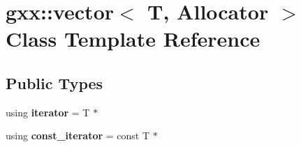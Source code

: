 \hypertarget{classgxx_1_1vector}{}\section{gxx\+:\+:vector$<$ T, Allocator $>$ Class Template Reference}
\label{classgxx_1_1vector}
\subsection*{Public Types}
\begin{DoxyCompactItemize}
\item 
using {\bfseries iterator} = T $\ast$\hypertarget{classgxx_1_1vector_a6fc8d0830e77e0354af968f5aa26191f}{}\label{classgxx_1_1vector_a6fc8d0830e77e0354af968f5aa26191f}

\item 
using {\bfseries const\+\_\+iterator} = const T $\ast$\hypertarget{classgxx_1_1vector_a55d6bd55efc88ae98b7c92cb608607ef}{}\label{classgxx_1_1vector_a55d6bd55efc88ae98b7c92cb608607ef}

\end{DoxyCompactItemize}
